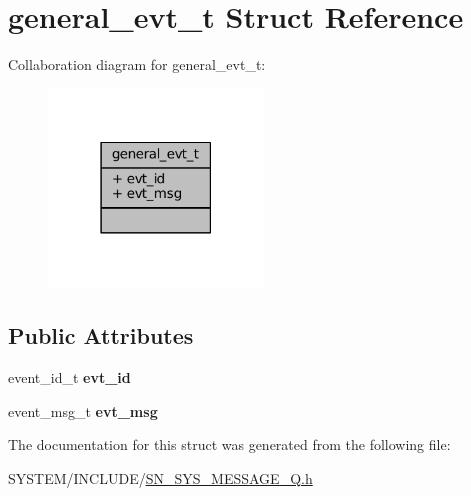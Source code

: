 \hypertarget{structgeneral__evt__t}{}\section{general\+\_\+evt\+\_\+t Struct Reference}
\label{structgeneral__evt__t}


Collaboration diagram for general\+\_\+evt\+\_\+t\+:\nopagebreak
\begin{figure}[H]
\begin{center}
\leavevmode
\includegraphics[width=162pt]{structgeneral__evt__t__coll__graph}
\end{center}
\end{figure}
\subsection*{Public Attributes}
\begin{DoxyCompactItemize}
\item 
\mbox{\label{structgeneral__evt__t_a2641588ad4dab3adfd0369a7afea080e}} 
event\+\_\+id\+\_\+t {\bfseries evt\+\_\+id}
\item 
\mbox{\label{structgeneral__evt__t_a165ec408f6e8af4f7f4f9d9bbe2e5183}} 
event\+\_\+msg\+\_\+t {\bfseries evt\+\_\+msg}
\end{DoxyCompactItemize}


The documentation for this struct was generated from the following file\+:\begin{DoxyCompactItemize}
\item 
S\+Y\+S\+T\+E\+M/\+I\+N\+C\+L\+U\+D\+E/\hyperlink{SN__SYS__MESSAGE__Q_8h}{S\+N\+\_\+\+S\+Y\+S\+\_\+\+M\+E\+S\+S\+A\+G\+E\+\_\+\+Q.\+h}\end{DoxyCompactItemize}
